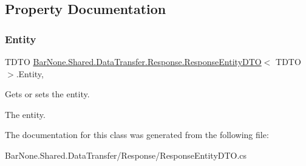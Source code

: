 \subsection{Property Documentation}
\mbox{\label{class_bar_none_1_1_shared_1_1_data_transfer_1_1_response_1_1_response_entity_d_t_o_a211db654bf1ce9dce4709867675ec855}} 
\subsubsection{\texorpdfstring{Entity}{Entity}}
{\footnotesize\ttfamily T\+D\+TO \mbox{\hyperlink{class_bar_none_1_1_shared_1_1_data_transfer_1_1_response_1_1_response_entity_d_t_o}{Bar\+None.\+Shared.\+Data\+Transfer.\+Response.\+Response\+Entity\+D\+TO}}$<$ T\+D\+TO $>$.Entity\hspace{0.3cm}{\ttfamily [get]}, {\ttfamily [set]}}



Gets or sets the entity. 

The entity. 

The documentation for this class was generated from the following file\+:\begin{DoxyCompactItemize}
\item 
Bar\+None.\+Shared.\+Data\+Transfer/\+Response/Response\+Entity\+D\+T\+O.\+cs\end{DoxyCompactItemize}
